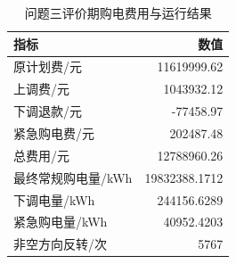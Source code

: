 \begin{table}[H]
\centering\small
\caption{问题三评价期购电费用与运行结果}\label{tab:q3-annual}
\begin{tabular}{lr}
\toprule
指标 & 数值\\
\midrule
原计划费/元 & 11619999.62\\
上调费/元 & 1043932.12\\
下调退款/元 & -77458.97\\
紧急购电费/元 & 202487.48\\
总费用/元 & 12788960.26\\
最终常规购电量/kWh & 19832388.1712\\
下调电量/kWh & 244156.6289\\
紧急购电量/kWh & 40952.4203\\
非空方向反转/次 & 5767\\
\bottomrule
\end{tabular}
\end{table}
